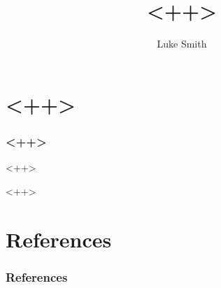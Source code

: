 \documentclass{beamer}
\title{<++>}
\author{Luke Smith}
\institute{University of Arizona}
\begin{document}
\begin{frame}

\maketitle

\end{frame}

\section{<++>}

\begin{frame}
\frametitle{<++>}

<++>


\end{frame}

<++>

\section{References}

\begin{frame}
\frametitle{References}
\printbibliography
\end{frame}
\end{document}
